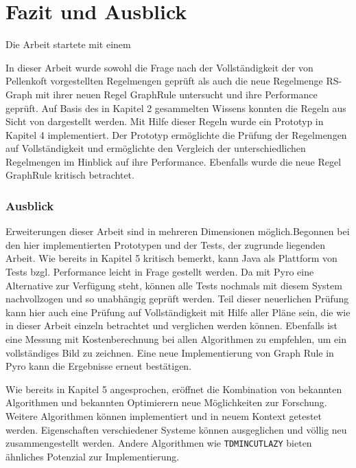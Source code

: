 \chapter{Fazit und Ausblick}






Die Arbeit startete mit einem


In dieser Arbeit wurde sowohl die Frage nach der Vollständigkeit der von Pellenkoft vorgestellten Regelmengen geprüft als auch die neue Regelmenge RS-Graph mit ihrer neuen Regel GraphRule untersucht und ihre Performance geprüft. Auf Basis des in Kapitel 2 gesammelten Wissens konnten die Regeln aus Sicht von \cite{shanbhag2014optimizing} dargestellt werden. Mit Hilfe dieser Regeln wurde ein Prototyp in Kapitel 4 implementiert. Der Prototyp ermöglichte die Prüfung der Regelmengen auf Vollständigkeit und ermöglichte den Vergleich der unterschiedlichen Regelmengen im Hinblick auf ihre Performance. Ebenfalls wurde die neue Regel GraphRule kritisch betrachtet.



\subsection{Ausblick}



Erweiterungen dieser Arbeit sind in mehreren Dimensionen möglich.Begonnen bei den hier implementierten Prototypen und der Tests, der zugrunde liegenden Arbeit.                                                                                                                                                   Wie bereits in Kapitel 5 kritisch bemerkt, kann Java als Plattform von Tests  bzgl. Performance leicht in Frage gestellt werden. Da mit Pyro eine Alternative zur Verfügung steht, können alle Tests nochmals mit diesem System nachvollzogen und so unabhängig geprüft werden. Teil dieser neuerlichen Prüfung kann hier auch eine Prüfung auf Vollständigkeit mit Hilfe aller Pläne sein, die wie in dieser Arbeit einzeln betrachtet und verglichen werden können. Ebenfalls ist eine Messung mit Kostenberechnung bei allen Algorithmen zu empfehlen, um ein vollständiges Bild zu zeichnen. Eine neue Implementierung von Graph Rule in Pyro kann die Ergebnisse erneut bestätigen.

Wie bereits in Kapitel 5 angesprochen, eröffnet die Kombination von bekannten Algorithmen und bekannten Optimierern neue Möglichkeiten zur Forschung. Weitere Algorithmen können implementiert und in neuem Kontext getestet werden. Eigenschaften verschiedener Systeme können ausgeglichen und völlig neu zusammengestellt werden. Andere Algorithmen wie \texttt{TDMINCUTLAZY} bieten ähnliches Potenzial zur Implementierung.

